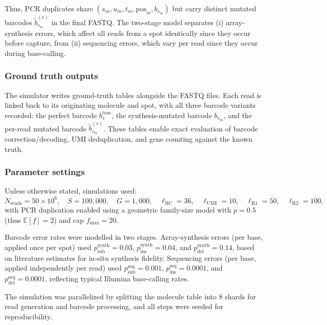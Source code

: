 Thus, PCR duplicates share $(s_m, u_m, t_m, \mathrm{pos}_m, b_{s_m})$ but carry distinct mutated barcodes $\tilde{b}_{s_m}^{(r)}$ in the final FASTQ. The two-stage model separates (i) array-synthesis errors, which affect all reads from a spot identically since they occur before capture, from (ii) sequencing errors, which vary per read since they occur during base-calling.

\subsubsection*{Ground truth outputs}

The simulator writes ground-truth tables alongside the FASTQ files. Each read is linked back to its originating molecule and spot, with all three barcode variants recorded: the perfect barcode $b_s^{\mathrm{true}}$, the synthesis-mutated barcode $b_{s_m}$, and the per-read mutated barcode $\tilde{b}_{s_m}^{(r)}$. These tables enable exact evaluation of barcode correction/decoding, UMI deduplication, and gene counting against the known truth.

\subsubsection*{Parameter settings}

Unless otherwise stated, simulations used:
\[
N_{\mathrm{reads}} = 50\times 10^6,\quad
S=100{,}000,\quad
G=1{,}000,\quad
\ell_{\mathrm{BC}}=36,\quad
\ell_{\mathrm{UMI}}=10,\quad
\ell_{\mathrm{R1}}=50,\quad
\ell_{\mathrm{R2}}=100,
\]
with PCR duplication enabled using a geometric family-size model with $p=0.5$ (thus $\mathbb{E}[f]=2$) and cap $f_{\max}=20$.

Barcode error rates were modelled in two stages. Array-synthesis errors (per base, applied once per spot) used
$p_{\mathrm{sub}}^{\mathrm{synth}}=0.03$, $p_{\mathrm{ins}}^{\mathrm{synth}}=0.04$, and $p_{\mathrm{del}}^{\mathrm{synth}}=0.14$,
based on literature estimates for in-situ synthesis fidelity.
Sequencing errors (per base, applied independently per read) used
$p_{\mathrm{sub}}^{\mathrm{seq}}=0.001$, $p_{\mathrm{ins}}^{\mathrm{seq}}=0.0001$, and $p_{\mathrm{del}}^{\mathrm{seq}}=0.0001$,
reflecting typical Illumina base-calling rates.

The simulation was parallelized by splitting the molecule table into 8 shards for read generation and barcode processing, and all steps were seeded for reproducibility.
